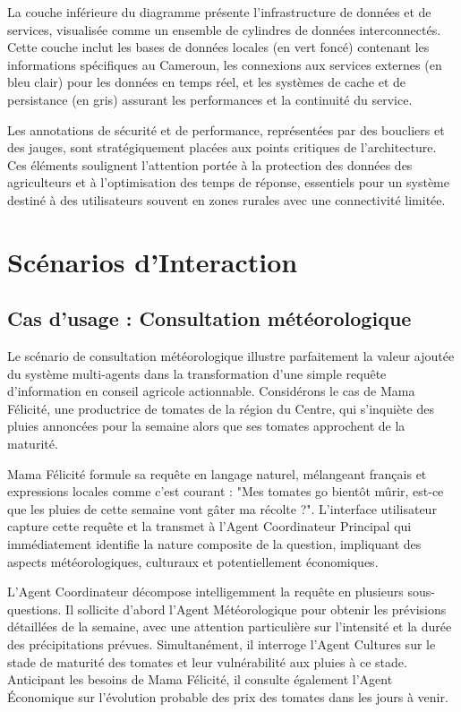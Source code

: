La couche inférieure du diagramme présente l'infrastructure de données et de services, visualisée comme un ensemble de cylindres de données interconnectés. Cette couche inclut les bases de données locales (en vert foncé) contenant les informations spécifiques au Cameroun, les connexions aux services externes (en bleu clair) pour les données en temps réel, et les systèmes de cache et de persistance (en gris) assurant les performances et la continuité du service.

Les annotations de sécurité et de performance, représentées par des boucliers et des jauges, sont stratégiquement placées aux points critiques de l'architecture. Ces éléments soulignent l'attention portée à la protection des données des agriculteurs et à l'optimisation des temps de réponse, essentiels pour un système destiné à des utilisateurs souvent en zones rurales avec une connectivité limitée.

\section{Scénarios d'Interaction}

\subsection{Cas d'usage : Consultation météorologique}

Le scénario de consultation météorologique illustre parfaitement la valeur ajoutée du système multi-agents dans la transformation d'une simple requête d'information en conseil agricole actionnable. Considérons le cas de Mama Félicité, une productrice de tomates de la région du Centre, qui s'inquiète des pluies annoncées pour la semaine alors que ses tomates approchent de la maturité.

Mama Félicité formule sa requête en langage naturel, mélangeant français et expressions locales comme c'est courant : "Mes tomates go bientôt mûrir, est-ce que les pluies de cette semaine vont gâter ma récolte ?". L'interface utilisateur capture cette requête et la transmet à l'Agent Coordinateur Principal qui immédiatement identifie la nature composite de la question, impliquant des aspects météorologiques, culturaux et potentiellement économiques.

L'Agent Coordinateur décompose intelligemment la requête en plusieurs sous-questions. Il sollicite d'abord l'Agent Météorologique pour obtenir les prévisions détaillées de la semaine, avec une attention particulière sur l'intensité et la durée des précipitations prévues. Simultanément, il interroge l'Agent Cultures sur le stade de maturité des tomates et leur vulnérabilité aux pluies à ce stade. Anticipant les besoins de Mama Félicité, il consulte également l'Agent Économique sur l'évolution probable des prix des tomates dans les jours à venir.

